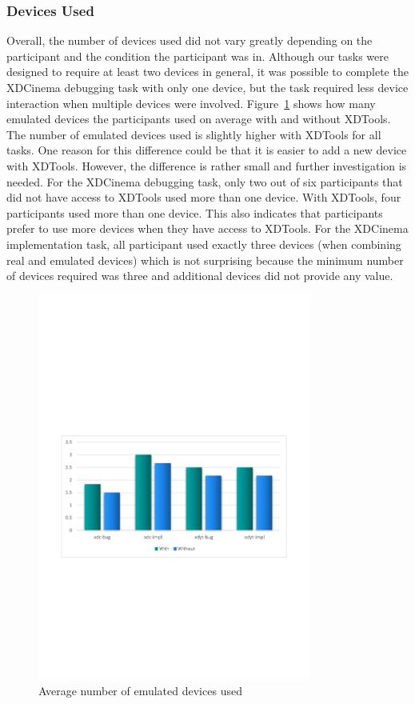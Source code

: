 \subsubsection{Devices Used}

Overall, the number of devices used did not vary greatly depending on the participant and the condition the participant was in. Although our tasks were designed to require at least two devices in general, it was possible to complete the XDCinema debugging task with only one device, but the task required less device interaction when multiple devices were involved. Figure~\ref{fig:n_emulated} shows how many emulated devices the participants used on average with and without XDTools. The number of emulated devices used is slightly higher with XDTools for all tasks. One reason for this difference could be that it is easier to add a new device with XDTools. However, the difference is rather small and further investigation is needed. For the XDCinema debugging task, only two out of six participants that did not have access to XDTools used more than one device. With XDTools, four participants used more than one device. This also indicates that participants prefer to use more devices when they have access to XDTools. For the XDCinema implementation task, all participant used exactly three devices (when combining real and emulated devices) which is not surprising because the minimum number of devices required was three and additional devices did not provide any value. 

\begin{figure}[h!]
  \centering
    \includegraphics[width=0.8\textwidth]{images/charts/n_emulated.pdf}
	\caption[Emulated device used]{Average number of emulated devices used}
	\label{fig:n_emulated}
\end{figure}

